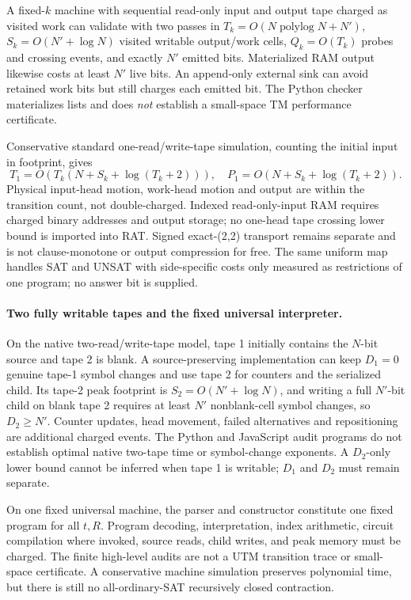 \documentclass[11pt]{article}
\begin{document}
A fixed-$k$ machine with sequential read-only input
and output tape charged as visited work can validate with
two passes in $T_k=O(N\operatorname{polylog}N+N')$,
$S_k=O(N'+\log N)$ visited writable output/work cells,
$Q_k=O(T_k)$ probes and crossing events, and exactly
$N'$ emitted bits. Materialized RAM output likewise
costs at least $N'$ live bits. An append-only external
sink can avoid retained work bits but still charges
each emitted bit. The Python checker materializes
lists and does \emph{not} establish a small-space TM
performance certificate.

Conservative standard one-read/write-tape simulation,
counting the initial input in footprint, gives
\[
T_1=O(T_k(N+S_k+\log(T_k+2))),\quad
P_1=O(N+S_k+\log(T_k+2)).
\]
Physical input-head motion, work-head motion and output
are within the transition count, not double-charged.
Indexed read-only-input RAM requires charged binary
addresses and output storage; no one-head tape
crossing lower bound is imported into RAT.
Signed exact-(2,2) transport remains separate and
is not clause-monotone or output compression for free.
The same uniform map handles SAT and UNSAT with
side-specific costs only measured as restrictions of
one program; no answer bit is supplied.


\paragraph{Two fully writable tapes and the fixed universal interpreter.}
On the native two-read/write-tape model, tape 1 initially contains the
$N$-bit source and tape 2 is blank. A source-preserving implementation
can keep $D_1=0$ genuine tape-1 symbol changes and use tape 2 for counters
and the serialized child. Its tape-2 peak footprint is
$S_2=O(N'+\log N)$, and writing a full $N'$-bit child on blank tape 2
requires at least $N'$ nonblank-cell symbol changes, so $D_2\ge N'$.
Counter updates, head movement, failed alternatives and repositioning
are additional charged events. The Python and JavaScript audit programs
do not establish optimal native two-tape time or symbol-change
exponents. A $D_2$-only lower bound cannot be inferred when tape 1
is writable; $D_1$ and $D_2$ must remain separate.

On one fixed universal machine, the parser and constructor constitute
one fixed program for all $t,R$. Program decoding, interpretation,
index arithmetic, circuit compilation where invoked, source reads,
child writes, and peak memory must be charged. The finite high-level
audits are not a UTM transition trace or small-space certificate.
A conservative machine simulation preserves polynomial time, but
there is still no all-ordinary-SAT recursively closed contraction.
\end{document}
